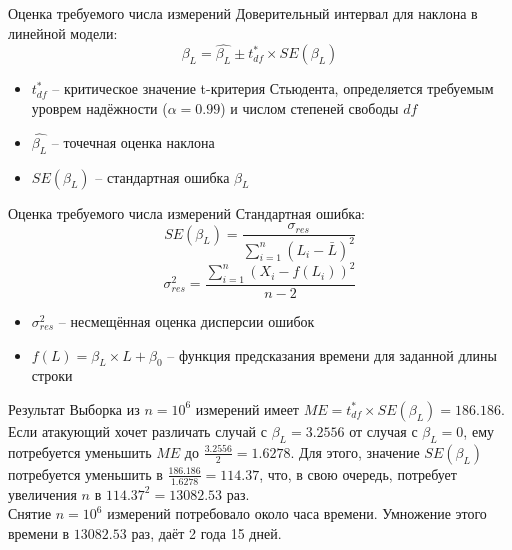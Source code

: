 \documentclass[14pt]{beamer}
\begin{document}
\begin{frame}{Оценка требуемого числа измерений}
  Доверительный интервал для наклона в линейной модели: \\
  \begin{equation}
  \beta_L = \hat{\beta_L} \pm t^{*}_{df} \times SE(\beta_L)
  \end{equation}
  \begin{itemize}
   \item $t^{*}_{df}$ -- критическое значение t-критерия Стьюдента, определяется
         требуемым уроврем надёжности ($\alpha = 0.99$) и числом степеней свободы $df$\\
   \item $\hat{\beta_L}$ -- точечная оценка наклона\\
   \item $SE(\beta_L)$ -- стандартная ошибка $\beta_L$
  \end{itemize}
\end{frame}

\begin{frame}[nologo]{Оценка требуемого числа измерений}
  Стандартная ошибка: \\
  \begin{equation}
  SE(\beta_L) = \frac{ \sigma_{res} }{ \sum^n_{i=1} (L_i - \bar{L})^2 }
  \end{equation}
  \begin{equation}
  \sigma_{res}^2 = \frac{ \sum^n_{i=1}  (X_i - f(L_i))^2 }{ n - 2 }
  \end{equation}
  \begin{itemize}
    \item $\sigma_{res}^2$ -- несмещённая оценка дисперсии ошибок \\
    \item $f(L) = \beta_{L} \times L + \beta_0$ -- функция предсказания времени для заданной длины строки \\
  \end{itemize}
\end{frame}

\begin{frame}[nologo]{Результат}
Выборка из $n = 10^6$ измерений имеет $ME = t^{*}_{df} \times SE(\beta_L) = 186.186$.
Если атакующий хочет различать случай с $\beta_L = 3.2556$ от случая с $\beta_L = 0$,
ему потребуется уменьшить $ME$ до $\frac{3.2556}{2} = 1.6278$. Для этого,
значение $SE(\beta_L)$ потребуется уменьшить в $\frac{186.186}{1.6278} = 114.37$,
что, в свою очередь, потребует увеличения $n$ в $114.37^2 = 13082.53$ раз.
\\[0.5cm]
Снятие $n = 10^6$ измерений потребовало около часа времени. Умножение этого времени в $13082.53$
раз, даёт 2 года 15 дней.
\end{frame}

\itmothankyou
\end{document}
